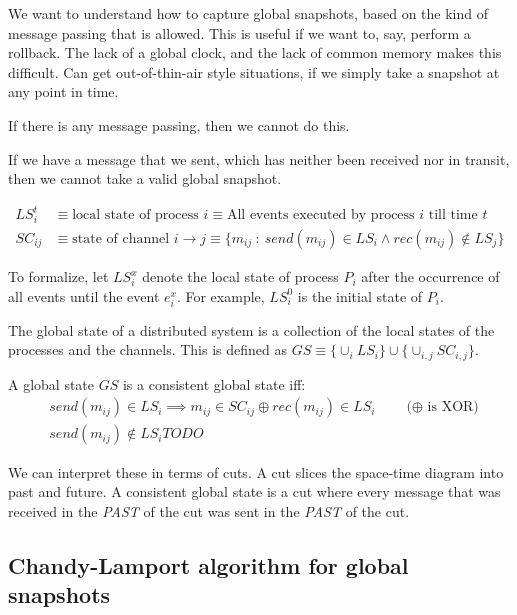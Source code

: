 \documentclass[11pt]{book}
\begin{document}
We want to understand how to capture global snapshots, based on the kind of
message passing that is allowed. This is useful if we want to, say, perform a
rollback. The lack of a global clock, and the lack of common memory makes this
difficult. Can get out-of-thin-air style situations, if we simply take a
snapshot at any point in time.

If there is any message passing, then we cannot do this.  

If we have a message that we sent, which has neither been received nor in
transit, then we cannot take a valid global snapshot. 

\begin{align*}
LS_i^t &\equiv \text{local state of process $i$} \equiv \text{All events executed by process $i$ till time $t$} \\
SC_{ij} &\equiv \text{state of channel $i \rightarrow j$} \equiv 
  \{ m_{ij}~:~ send(m_{ij}) \in LS_i \land rec(m_{ij}) \not \in LS_j \}
\end{align*}

To formalize, let $LS_i^x$ denote the local state of process $P_i$ after
the occurrence of all events until the event $e_i^x$. For example,
$LS_i^0$ is the initial state of $P_i$.


The global state of a distributed system is a collection of the local states of the
processes and the channels. This is defined as $GS \equiv \{ \cup_i LS_i \} \cup \{ \cup_{i,j} SC_{i, j} \}$.

A global state $GS$ is a consistent global state iff:
\begin{align*}
    &send(m_{ij}) \in LS_i \implies m_{ij} \in SC_{ij} \oplus rec (m_{ij}) \in LS_i  \qquad \text{($\oplus$ is XOR)} \\
    &send(m_{ij}) \notin LS_i TODO
\end{align*}


We can interpret these in terms of cuts. A cut slices the space-time diagram
into past and future. A consistent global state is a cut where every message
that was received in the \emph{PAST} of the cut was sent in the \emph{PAST} of
the cut.

\subsection{Chandy-Lamport algorithm for global snapshots}
\end{document}
